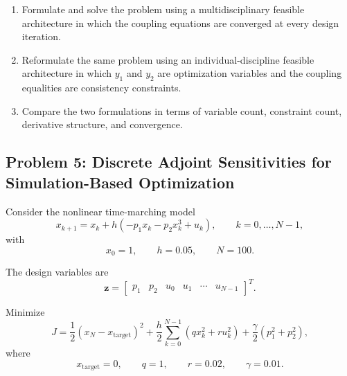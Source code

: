 \begin{enumerate}
    \item Formulate and solve the problem using a multidisciplinary feasible
    architecture in which the coupling equations are converged at every
    design iteration.

    \item Reformulate the same problem using an individual-discipline
    feasible architecture in which $y_1$ and $y_2$ are optimization
    variables and the coupling equalities are consistency constraints.

    \item Compare the two formulations in terms of variable count,
    constraint count, derivative structure, and convergence.
\end{enumerate}


\subsection*{Problem 5: Discrete Adjoint Sensitivities for Simulation-Based Optimization}

Consider the nonlinear time-marching model
\begin{equation}
x_{k+1}
=
x_k
+
h
\left(
-p_1x_k
-p_2x_k^3
+u_k
\right),
\qquad
k=0,\ldots,N-1,
\end{equation}
with
\begin{equation}
x_0=1,
\qquad
h=0.05,
\qquad
N=100.
\end{equation}

The design variables are
\begin{equation}
\mathbf{z}
=
\begin{bmatrix}
p_1&
p_2&
u_0&
u_1&
\cdots&
u_{N-1}
\end{bmatrix}^{T}.
\end{equation}

Minimize
\begin{equation}
J
=
\frac{1}{2}
\left(
x_N-x_{\mathrm{target}}
\right)^2
+
\frac{h}{2}
\sum_{k=0}^{N-1}
\left(
q x_k^2
+
r u_k^2
\right)
+
\frac{\gamma}{2}
\left(
p_1^2+p_2^2
\right),
\end{equation}
where
\begin{equation}
x_{\mathrm{target}}=0,
\qquad
q=1,
\qquad
r=0.02,
\qquad
\gamma=0.01.
\end{equation}

